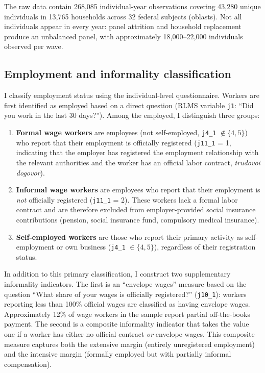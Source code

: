 \documentclass[12pt]{article}
\begin{document}
The raw data contain 268,085 individual-year observations covering 43,280 unique individuals in 13,765 households across 32 federal subjects (oblasts). Not all individuals appear in every year: panel attrition and household replacement produce an unbalanced panel, with approximately 18,000--22,000 individuals observed per wave.

\subsection{Employment and informality classification}

I classify employment status using the individual-level questionnaire. Workers are first identified as employed based on a direct question (RLMS variable \texttt{j1}: ``Did you work in the last 30 days?''). Among the employed, I distinguish three groups:

\begin{enumerate}
\item \textbf{Formal wage workers} are employees (not self-employed, \texttt{j4\_1} $\notin \{4, 5\}$) who report that their employment is officially registered (\texttt{j11\_1} = 1, indicating that the employer has registered the employment relationship with the relevant authorities and the worker has an official labor contract, \textit{trudovoi dogovor}).

\item \textbf{Informal wage workers} are employees who report that their employment is \textit{not} officially registered (\texttt{j11\_1} = 2). These workers lack a formal labor contract and are therefore excluded from employer-provided social insurance contributions (pension, social insurance fund, compulsory medical insurance).

\item \textbf{Self-employed workers} are those who report their primary activity as self-employment or own business (\texttt{j4\_1} $\in \{4, 5\}$), regardless of their registration status.
\end{enumerate}

In addition to this primary classification, I construct two supplementary informality indicators. The first is an ``envelope wages'' measure based on the question ``What share of your wages is officially registered?'' (\texttt{j10\_1}): workers reporting less than 100\% official wages are classified as having envelope wages. Approximately 12\% of wage workers in the sample report partial off-the-books payment. The second is a composite informality indicator that takes the value one if a worker has either no official contract \textit{or} envelope wages. This composite measure captures both the extensive margin (entirely unregistered employment) and the intensive margin (formally employed but with partially informal compensation).
\end{document}
